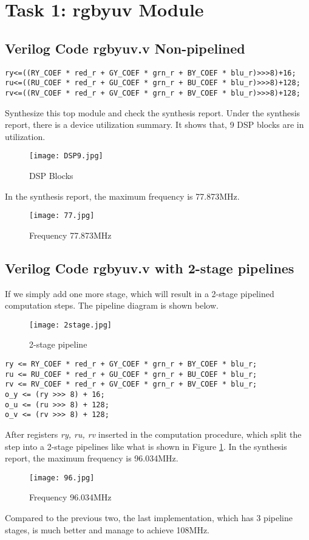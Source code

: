 \documentclass[12pt,fleqn]{article}
\begin{document}
\section{Task 1: rgbyuv Module}
\label{sec:task1}


\subsection{Verilog Code rgbyuv.v Non-pipelined}
{\linespread{0.75}
\begin{lstlisting}
ry<=((RY_COEF * red_r + GY_COEF * grn_r + BY_COEF * blu_r)>>>8)+16;
ru<=((RU_COEF * red_r + GU_COEF * grn_r + BU_COEF * blu_r)>>>8)+128;
rv<=((RV_COEF * red_r + GV_COEF * grn_r + BV_COEF * blu_r)>>>8)+128;
\end{lstlisting}
\par}
Synthesize this top module and check the synthesis report. Under the synthesis report, there is a device utilization summary. It shows that, 9 DSP blocks are in utilization.
\begin{figure}[H]
\centering
\texttt{[image: DSP9.jpg]}
\caption{DSP Blocks}
\end{figure}
In the synthesis report, the maximum frequency is 77.873MHz.
\begin{figure}[H]
\centering
\texttt{[image: 77.jpg]}
\caption{Frequency 77.873MHz}
\end{figure}

\subsection{Verilog Code rgbyuv.v with 2-stage pipelines}
If we simply add one more stage, which will result in a 2-stage pipelined computation steps. The pipeline diagram is shown below.
\begin{figure}[H]
\centering
\texttt{[image: 2stage.jpg]}
\caption{2-stage pipeline}
\label{fig:2stage}
\end{figure}


{\linespread{0.75}
\begin{lstlisting}
ry <= RY_COEF * red_r + GY_COEF * grn_r + BY_COEF * blu_r;
ru <= RU_COEF * red_r + GU_COEF * grn_r + BU_COEF * blu_r;
rv <= RV_COEF * red_r + GV_COEF * grn_r + BV_COEF * blu_r;
o_y <= (ry >>> 8) + 16;
o_u <= (ru >>> 8) + 128;
o_v <= (rv >>> 8) + 128;
\end{lstlisting}
\par}
After registers \emph{ry, ru, rv} inserted in the computation procedure, which split the step into a 2-stage pipelines like what is shown in Figure \ref{fig:2stage}. In the synthesis report, the maximum frequency is 96.034MHz.
\begin{figure}[H]
\centering
\texttt{[image: 96.jpg]}
\caption{Frequency 96.034MHz}
\end{figure}
Compared to the previous two, the last implementation, which has 3 pipeline stages, is much better and manage to achieve 108MHz.
\end{document}
